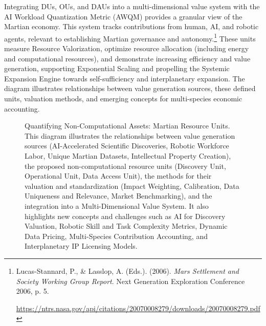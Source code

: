 \documentclass[fontsize=10pt, oneside, DIV=calc]{scrartcl}
\begin{document}
\medskip

\noindent
Integrating DUs, OUs, and DAUs into a multi-dimensional value system with the AI Workload Quantization Metric (AWQM) provides a granular view of the Martian economy. This system tracks contributions from human, AI, and robotic agents, relevant to establishing Martian governance and autonomy.\footnote{Lucas-Stannard, P., \& Lasslop, A. (Eds.). (2006). \textit{Mars Settlement and Society Working Group Report}. Next Generation Exploration Conference 2006, p. 5. 











\href{https://ntrs.nasa.gov/api/citations/20070008279/downloads/20070008279.pdf}\url{https://ntrs.nasa.gov/api/citations/20070008279/downloads/20070008279.pdf}} These units measure Resource Valorization, optimize resource allocation (including energy and computational resources), and demonstrate increasing efficiency and value generation, supporting Exponential Scaling and propelling the Systemic Expansion Engine towards self-sufficiency and interplanetary expansion. The diagram illustrates relationships between value generation sources, these defined units, valuation methods, and emerging concepts for multi-species economic accounting.


\begin{figure}[H]
  \centering
  \noindent
  \begin{minipage}{\textwidth}
    \centering
    \caption{Quantifying Non-Computational Assets: Martian Resource Units. This diagram illustrates the relationships between value generation sources (AI-Accelerated Scientific Discoveries, Robotic Workforce Labor, Unique Martian Datasets, Intellectual Property Creation), the proposed non-computational resource units (Discovery Unit, Operational Unit, Data Access Unit), the methods for their valuation and standardization (Impact Weighting, Calibration, Data Uniqueness and Relevance, Market Benchmarking), and the integration into a Multi-Dimensional Value System. It also highlights new concepts and challenges such as AI for Discovery Valuation, Robotic Skill and Task Complexity Metrics, Dynamic Data Pricing, Multi-Species Contribution Accounting, and Interplanetary IP Licensing Models.}
  \end{minipage}
\end{figure}
\end{document}
